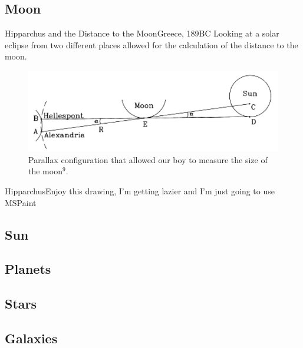 \documentclass[12pt]{beamer}
\begin{document}
    \subsection{Moon}
        \begin{frame}{Hipparchus and the Distance to the Moon}{Greece, 189BC} \centering
            Looking at a solar eclipse from two different places allowed for the calculation of the distance to the moon.
            \begin{figure}
                \includegraphics[scale=0.5, frame, bb=0 0 430 150]{hipparchus.png}
                \caption{Parallax configuration that allowed our boy to measure the size of the moon$^9$.}
            \end{figure}
        \end{frame}
        \begin{frame}{Hipparchus}{Enjoy this drawing, I'm getting lazier and I'm just going to use MSPaint}
            
        \end{frame}
    \subsection{Sun}
    \subsection{Planets}
    \subsection{Stars}
    \subsection{Galaxies}
\end{document}
